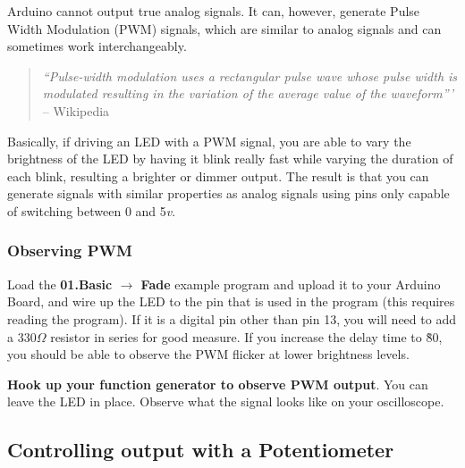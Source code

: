 \documentclass[11pt,a4paper]{article}
\begin{document}
Arduino cannot output true analog signals.  It can, however, generate Pulse Width Modulation (PWM) signals, which are similar to analog signals and can sometimes work interchangeably.  

\begin{quote}
\emph{``Pulse-width modulation uses a rectangular pulse wave whose pulse width is modulated resulting in the variation of the average value of the waveform'''} -- Wikipedia\cite{pwm}
\end{quote}

Basically, if driving an LED with a PWM signal, you are able to vary the brightness of the LED by having it blink really fast while varying the duration of each blink, resulting a brighter or dimmer output.  The result is that you can generate signals with similar properties as analog signals using pins only capable of switching between 0 and 5\emph{v}.

\subsubsection{Observing PWM} %
\label{sub:observing_pwm}

Load the \textbf{01.Basic $\rightarrow$ Fade} example program and upload it to your Arduino Board, and wire up the LED to the pin that is used in the program (this requires reading the program).  If it is a digital pin other than pin 13, you will need to add a $330\Omega$ resistor in series for good measure.  If you increase the delay time to \~80, you should be able to observe the PWM flicker at lower brightness levels.  

\textbf{Hook up your function generator to observe PWM output}.  You can leave the LED in place.  Observe what the signal looks like on your oscilloscope. 


\subsection{Controlling output with a Potentiometer} %
\label{sub:potentiometer}
\end{document}
